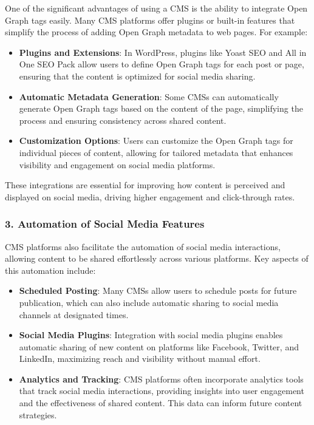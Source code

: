 One of the significant advantages of using a CMS is the ability to integrate Open Graph tags easily. Many CMS platforms offer plugins or built-in features that simplify the process of adding Open Graph metadata to web pages. For example:

\begin{itemize}
    \item \textbf{Plugins and Extensions}: In WordPress, plugins like Yoast SEO and All in One SEO Pack allow users to define Open Graph tags for each post or page, ensuring that the content is optimized for social media sharing.
    \item \textbf{Automatic Metadata Generation}: Some CMSs can automatically generate Open Graph tags based on the content of the page, simplifying the process and ensuring consistency across shared content.
    \item \textbf{Customization Options}: Users can customize the Open Graph tags for individual pieces of content, allowing for tailored metadata that enhances visibility and engagement on social media platforms.
\end{itemize}

These integrations are essential for improving how content is perceived and displayed on social media, driving higher engagement and click-through rates.

\subsubsection{3. Automation of Social Media Features}

CMS platforms also facilitate the automation of social media interactions, allowing content to be shared effortlessly across various platforms. Key aspects of this automation include:

\begin{itemize}
    \item \textbf{Scheduled Posting}: Many CMSs allow users to schedule posts for future publication, which can also include automatic sharing to social media channels at designated times.
    \item \textbf{Social Media Plugins}: Integration with social media plugins enables automatic sharing of new content on platforms like Facebook, Twitter, and LinkedIn, maximizing reach and visibility without manual effort.
    \item \textbf{Analytics and Tracking}: CMS platforms often incorporate analytics tools that track social media interactions, providing insights into user engagement and the effectiveness of shared content. This data can inform future content strategies.
\end{itemize}


